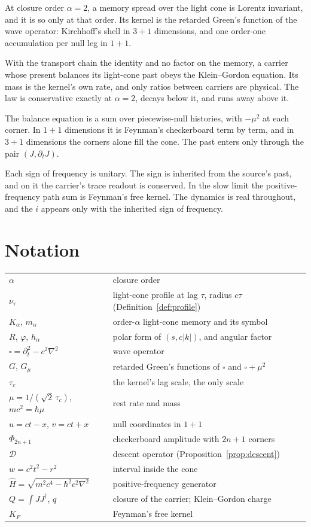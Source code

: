 \documentclass[11pt]{amsart}
\theoremstyle{definition}
\theoremstyle{remark}
\newcommand{\Desc}{\mathcal D}
\begin{document}
At closure order $\alpha=2$, a memory spread over the light cone is Lorentz invariant, and it is so only at that order. Its kernel is the retarded Green's function of the wave operator: Kirchhoff's shell in $3+1$ dimensions, and one order-one accumulation per null leg in $1+1$.

With the transport chain the identity and no factor on the memory, a carrier whose present balances its light-cone past obeys the Klein--Gordon equation. Its mass is the kernel's own rate, and only ratios between carriers are physical. The law is conservative exactly at $\alpha=2$, decays below it, and runs away above it.

The balance equation is a sum over piecewise-null histories, with $-\mu^2$ at each corner. In $1+1$ dimensions it is Feynman's checkerboard term by term, and in $3+1$ dimensions the corners alone fill the cone. The past enters only through the pair $(J,\partial_tJ)$.

Each sign of frequency is unitary. The sign is inherited from the source's past, and on it the carrier's trace readout is conserved. In the slow limit the positive-frequency path sum is Feynman's free kernel. The dynamics is real throughout, and the $i$ appears only with the inherited sign of frequency.

\appendix
\section{Notation}

\begin{tabular}{ll}
$\alpha$ & closure order\\
$\nu_\tau$ & light-cone profile at lag $\tau$, radius $c\tau$ (Definition~\ref{def:profile})\\
$K_\alpha$, $m_\alpha$ & order-$\alpha$ light-cone memory and its symbol\\
$R$, $\varphi$, $h_\alpha$ & polar form of $(s,c\lvert k\rvert)$, and angular factor\\
$\square=\partial_t^2-c^2\nabla^2$ & wave operator\\
$G$, $G_\mu$ & retarded Green's functions of $\square$ and $\square+\mu^2$\\
$\tau_c$ & the kernel's lag scale, the only scale\\
$\mu=1/(\sqrt2\,\tau_c)$, $mc^2=\hbar\mu$ & rest rate and mass\\
$u=ct-x$, $v=ct+x$ & null coordinates in $1+1$\\
$\Phi_{2n+1}$ & checkerboard amplitude with $2n+1$ corners\\
$\Desc$ & descent operator (Proposition~\ref{prop:descent})\\
$w=c^2t^2-r^2$ & interval inside the cone\\
$\hat H=\sqrt{m^2c^4-\hbar^2c^2\nabla^2}$ & positive-frequency generator\\
$Q=\int JJ^\dagger$, $q$ & closure of the carrier; Klein--Gordon charge\\
$K_F$ & Feynman's free kernel\\
\end{tabular}
\end{document}
